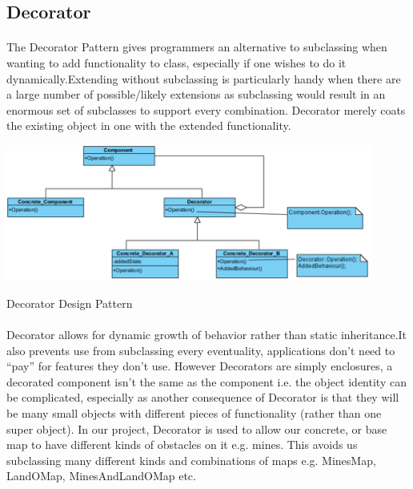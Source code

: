 \subsection{Decorator}	
	\vspace{3 mm}
	\begin{multicols}{2}
	\paragraph{}
		The Decorator Pattern gives programmers an alternative to subclassing when wanting to add functionality to class, especially if one wishes to 
		do it dynamically.Extending without subclassing is particularly handy when there are a large number of possible/likely extensions as 
		subclassing would result in an enormous set of subclasses to support every combination. Decorator merely coats the existing object in one 
		with the extended functionality.
	\end{multicols}	
	
	\begin{figurehere}
		\centering
		\includegraphics[width=120mm]{figures/decorator.png}
		\caption{Decorator Design Pattern}
	\end{figurehere}
	
	\begin{multicols}{2}
	\paragraph{}
		\vspace{8 mm}
		Decorator allows for dynamic growth of behavior rather than static inheritance.It also prevents use from subclassing every eventuality, 
		applications don’t need to “pay” for features they don’t use.  However Decorators are simply enclosures, a decorated component isn’t the 
		same as the component i.e. the object identity can be complicated, especially as another consequence of Decorator is that they will be many 
		small objects with different pieces of functionality (rather than one super object).
		\newline
		\newline
		In our project, Decorator is used to allow our concrete, or base map to have different kinds of obstacles on it e.g. mines. This avoids us 
		subclassing many different kinds and combinations of maps e.g. MinesMap, LandOMap, MinesAndLandOMap etc.
	\end{multicols}	

